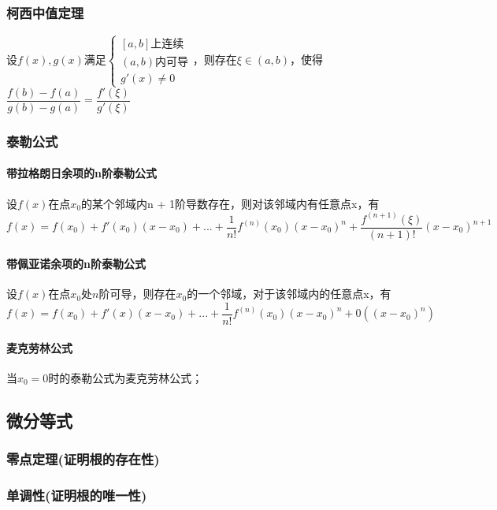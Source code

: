 \subsubsection{柯西中值定理}
设\(f(x), g(x)\)满足\(\begin{cases}
[a, b]\text{上连续} \\ 
(a, b)\text{内可导} \\ 
g'(x) \neq 0
\end{cases}\)，则存在\(\xi \in (a, b)\)，使得\(\dfrac{f(b) - f(a)}{g(b) - g(a)} = \dfrac{f'(\xi)}{g'(\xi)}\)

\subsubsection{泰勒公式}

\paragraph{带拉格朗日余项的n阶泰勒公式}
设\(f(x)\)在点\(x_0\)的某个邻域内n + 1阶导数存在，则对该邻域内有任意点x，有\[f(x) = f(x_0) + f'(x_0)(x - x_0) + ... + \dfrac{1}{n!}f^{(n)}(x_0)(x - x_0)^n + \dfrac{f^{(n + 1)}(\xi)}{(n + 1)!}(x - x_0)^{n + 1}\]

\paragraph{带佩亚诺余项的n阶泰勒公式}
设\(f(x)\)在点\(x_0\)处\(n\)阶可导，则存在\(x_0\)的一个邻域，对于该邻域内的任意点x，有\[f(x) = f(x_0) + f'(x)(x - x_0) + ... + \dfrac{1}{n!}f^{(n)}(x_0)(x - x_0)^n + 0((x - x_0)^n)\]

\paragraph{麦克劳林公式}
当\(x_0 = 0\)时的泰勒公式为麦克劳林公式；


\subsection{微分等式}

\subsubsection{零点定理(证明根的存在性)}

\subsubsection{单调性(证明根的唯一性)}

